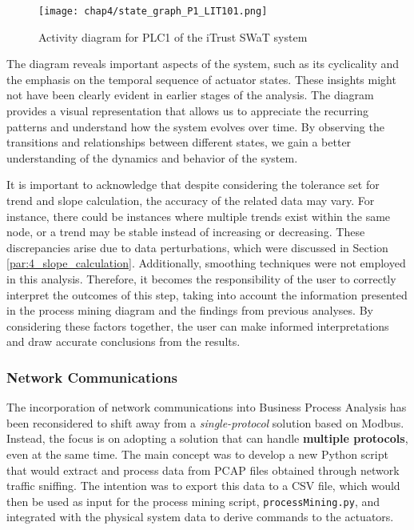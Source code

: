 \begin{figure}[ht]
	\centering
	\texttt{[image: chap4/state\_graph\_P1\_LIT101.png]}
	\caption{Activity diagram for PLC1 of the iTrust SWaT system}
	\label{fig:4_process_mining_graph}
\end{figure}

\noindent The diagram reveals important aspects of the system, such as its cyclicality and the emphasis on the temporal sequence of actuator states. These insights might not have been clearly evident in earlier stages of the analysis. The diagram provides a visual representation that allows us to appreciate the recurring patterns and understand how the system evolves over time. By observing the transitions and relationships between different states, we gain a better understanding of the dynamics and behavior of the system.

\bigskip
It is important to acknowledge that despite considering the tolerance set for trend and slope calculation, the accuracy of the related data may vary. For instance, there could be instances where multiple trends exist within the same node, or a trend may be stable instead of increasing or decreasing. These discrepancies arise due to data perturbations, which were discussed in Section \ref{par:4_slope_calculation}. Additionally, smoothing techniques were not employed in this analysis. Therefore, it becomes the responsibility of the user to correctly interpret the outcomes of this step, taking into account the information presented in the process mining diagram and the findings from previous analyses. By considering these factors together, the user can make informed interpretations and draw accurate conclusions from the results.

\subsubsection{Network Communications}
\label{subsub:4_proc_mining_net}
The incorporation of network communications into Business Process Analysis has been reconsidered to shift away from a \textit{single-protocol} solution based on Modbus. Instead, the focus is on adopting a solution that can handle \textbf{multiple protocols}, even at the same time.\newline
The main concept was to develop a new Python script that would extract and process data from PCAP files obtained through network traffic sniffing. The intention was to export this data to a CSV file, which would then be used as input for the process mining script, \texttt{processMining.py}, and integrated with the physical system data to derive commands to the actuators.

